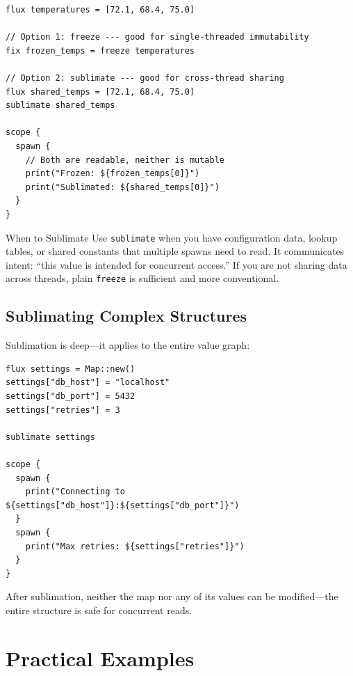 \begin{lstlisting}[language=Lattice, caption={Sublimate and freeze comparison}]
flux temperatures = [72.1, 68.4, 75.0]

// Option 1: freeze --- good for single-threaded immutability
fix frozen_temps = freeze temperatures

// Option 2: sublimate --- good for cross-thread sharing
flux shared_temps = [72.1, 68.4, 75.0]
sublimate shared_temps

scope {
  spawn {
    // Both are readable, neither is mutable
    print("Frozen: ${frozen_temps[0]}")
    print("Sublimated: ${shared_temps[0]}")
  }
}
\end{lstlisting}

\begin{tipbox}{When to Sublimate}
Use \lstinline|sublimate| when you have configuration data, lookup tables, or shared constants that multiple spawns need to read.
It communicates intent: ``this value is intended for concurrent access.''
If you are not sharing data across threads, plain \lstinline|freeze| is sufficient and more conventional.
\end{tipbox}

\subsection{Sublimating Complex Structures}

Sublimation is deep---it applies to the entire value graph:

\begin{lstlisting}[language=Lattice, caption={Deep sublimation}]
flux settings = Map::new()
settings["db_host"] = "localhost"
settings["db_port"] = 5432
settings["retries"] = 3

sublimate settings

scope {
  spawn {
    print("Connecting to ${settings["db_host"]}:${settings["db_port"]}")
  }
  spawn {
    print("Max retries: ${settings["retries"]}")
  }
}
\end{lstlisting}

After sublimation, neither the map nor any of its values can be modified---the entire structure is safe for concurrent reads.

\section{Practical Examples}\label{sec:concurrency-practical-examples}

